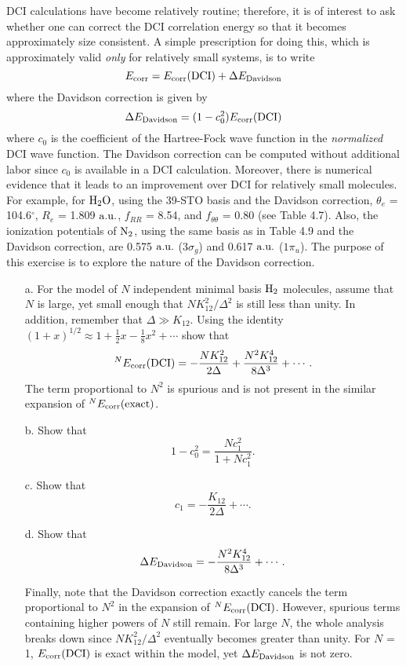 \documentclass[a4paper]{book}
\newcommand{\corr}{{\rm corr}}
\newcommand{\au}{{\rm a.u.}}
\begin{document}
	\begin{exercise}
	DCI calculations have become relatively routine; therefore, it is of interest to ask whether one can correct the DCI correlation energy so that it becomes approximately size consistent. A simple prescription for doing this, which is approximately valid {\it only} for relatively small systems, is to write
	\[
		E_\corr = E_\corr( {\rm DCI} ) + \Delta E_{\rm Davidson}
	\]
	where the Davidson correction is given by
	\[
		\Delta E_{\rm Davidson} = ( 1 - c^2_0 ) E_\corr( {\rm DCI} )
	\]
	where $c_0$ is the coefficient of the Hartree-Fock wave function in the {\it normalized} DCI wave function. The Davidson correction can be computed without additional labor since $c_0$ is available in a DCI calculation. Moreover, there is numerical evidence that it leads to an improvement over DCI for relatively small molecules. For example, for $\ce{H2O}$, using the 39-STO basis and the Davidson correction, $\theta_e$ = 104.6$^\circ$, $R_e$ = 1.809 $\au$, $f_{RR}$ = 8.54, and $f_{\theta\theta}$ = 0.80 (see Table 4.7). Also, the ionization potentials of $\ce{N2}$, using the same basis as in Table 4.9 and the Davidson correction, are 0.575 $\au$ ($3\sigma_g$) and 0.617 $\au$ ($1\pi_u$). The purpose of this exercise is to explore the nature of the Davidson correction.
	\begin{enumerate}
	
	\item[a.] For the model of $N$ independent minimal basis $\ce{H2}$ molecules, assume that $N$ is large, yet small enough that $NK^2_{12}/\Delta^2$ is still less than unity. In addition, remember that $\Delta \gg K_{12}$. Using the identity $( 1 + x )^{1/2} \approx 1 + \frac{1}{2} x - \frac{1}{8} x^2 + \cdots$ show that
	\[
		{}^N E_\corr( {\rm DCI} ) = - \frac{ N K^2_{12} }{ 2\Delta } + \frac{ N^2 K^4_{12} }{ 8\Delta^3 } + \cdots.
	\]	
	The term proportional to $N^2$ is spurious and is not present in the similar expansion of ${}^N E_\corr( {\rm exact} )$.
	
	\item[b.] Show that
	\[
		1 - c^2_0 = \frac{ N c^2_1 }{ 1 + N c^2_1 }.
	\]
	
	\item[c.] Show that
	\[
		c_1 = - \frac{ K_{12} }{ 2\Delta } + \cdots.
	\]	
	
	\item[d.] Show that
	\[
		\Delta E_{\rm Davidson} = - \frac{ N^2 K^4_{12} }{ 8 \Delta^3 } + \cdots .
	\]

	Finally, note that the Davidson correction exactly cancels the term proportional to $N^2$ in the expansion of ${}^N E_\corr( {\rm DCI} )$. However, spurious terms containing higher powers of $N$ still remain. For large $N$, the whole analysis breaks down since $N K^2_{12} / \Delta^2$ eventually becomes greater than unity. For $N$ = 1, $E_\corr( {\rm DCI} )$ is exact within the model, yet $\Delta E_{\rm Davidson}$ is not zero.
	

\end{enumerate}
\end{exercise}
\end{document}
